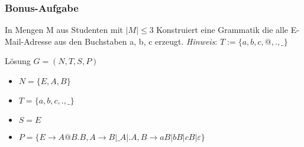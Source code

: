 \begin{frame}
  \frametitle{Bonus-Aufgabe}
  \begin{exampleblock}{In Mengen M aus Studenten mit $|M| \leq 3$}
    Konstruiert eine Grammatik die alle E-Mail-Adresse aus den Buchstaben {a, b, c} erzeugt.
    \emph{Hinweis}: $T := \{a, b, c, @, ., \_\}$
  \end{exampleblock}\pause
  \begin{exampleblock}{Lösung}
    $G = (N, T, S, P)$
    \begin{itemize}
      \item $N = \{E, A, B\}$
      \item $T = \{a, b, c, ., \_\}$
      \item $S = E$
      \item $P = \{E \longrightarrow A@B.B, A \longrightarrow B|\_A|.A, B \longrightarrow aB | bB | cB | \varepsilon\}$
    \end{itemize}
  \end{exampleblock}
\end{frame}
